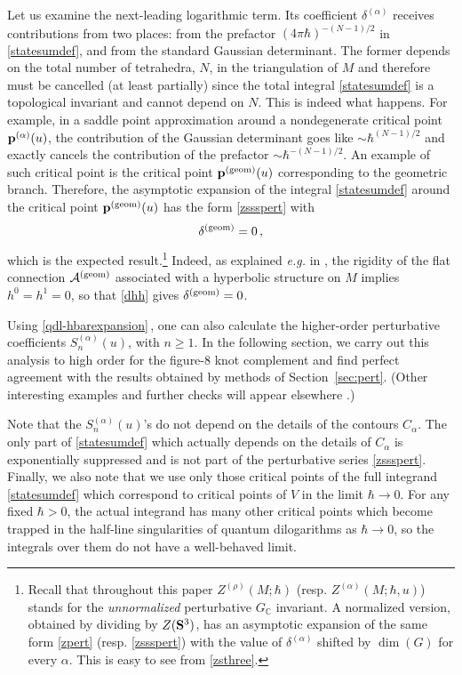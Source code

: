 \documentclass[hyper]{JHEP3}
\def\CA {{\cal A}}
\newcommand{\C}{{\mathbb{C}}}
\newcommand\be{\begin{equation}}
\newcommand\ee{\end{equation}}
\begin{document}
Let us examine the next-leading logarithmic term.
Its coefficient $\delta^{(\alpha)}$ receives contributions from
two places: from the prefactor $(4\pi \hbar)^{-(N-1)/2}$ in \eqref{statesumdef},
and from the standard Gaussian determinant.
The former depends on the total number of tetrahedra, $N$,
in the triangulation of $M$ and therefore must be cancelled (at least partially)
since the total integral \eqref{statesumdef} is a topological invariant
and cannot depend on $N$. This is indeed what happens.
For example, in a saddle point approximation around a nondegenerate
critical point ${\bf p}^{(\alpha)}(u)$, the contribution of
the Gaussian determinant goes like $\sim \hbar^{(N-1)/2}$
and exactly cancels the contribution of the prefactor $\sim \hbar^{- (N-1)/2}$.
An example of such critical point is the critical point ${\bf p}^{({\rm geom})} (u)$
corresponding to the geometric branch.
Therefore, the asymptotic expansion of
the integral \eqref{statesumdef} around the critical point ${\bf p}^{({\rm geom})} (u)$
has the form \eqref{zssspert} with
\be
\delta^{({\rm geom})} = 0\,,
\label{dgeomzero}
\ee
which is the expected result.\footnote{Recall that throughout this paper
$Z^{(\rho)} (M;\hbar)$ (resp. $Z^{(\alpha)} (M;\hbar,u)$)
stands for the {\it unnormalized} perturbative $G_{\C}$ invariant.
A normalized version, obtained by dividing by $Z ({\bf S}^3)$,
has an asymptotic expansion of the same form \eqref{zpert} (resp. \eqref{zssspert})
with the value of $\delta^{(\alpha)}$ shifted by $\dim (G)$ for every $\alpha$.
This is easy to see from \eqref{zsthree}.}
Indeed, as explained {\it e.g.} in \cite{gukov-2003,gukov-2006},
the rigidity of the flat connection $\CA^{({\rm geom})}$ associated
with a hyperbolic structure on $M$ implies $h^0 = h^1 = 0$,
so that \eqref{dhh} gives $\delta^{({\rm geom})} = 0$.

Using \eqref{qdl-hbarexpansion}\,, one can also calculate the higher-order perturbative
coefficients $S_n^{(\alpha)}(u)$, with $n \ge 1$.
In the following section, we carry out this analysis to
high order for the figure-8 knot complement and find perfect agreement
with the results obtained by methods of Section~\ref{sec:pert}.
(Other interesting examples and further checks will appear elsewhere \cite{dimofte-2009}.)

Note that the $S_n^{(\alpha)}(u)$'s do not depend on the details of the contours $C_{\alpha}$.
The only part of \eqref{statesumdef} which actually depends on the details of $C_\alpha$
is 
exponentially suppressed and is not
part of the perturbative series \eqref{zssspert}.
Finally, we also note that
we use only those critical points of the full integrand \eqref{statesumdef}
which correspond to critical points of $V$ in the limit $\hbar \to 0$.
For any fixed $\hbar > 0$, the actual integrand has many other critical
points which become trapped in the half-line singularities of quantum dilogarithms
as $\hbar \to 0$,
so the integrals over them do not have a well-behaved limit.
\end{document}

